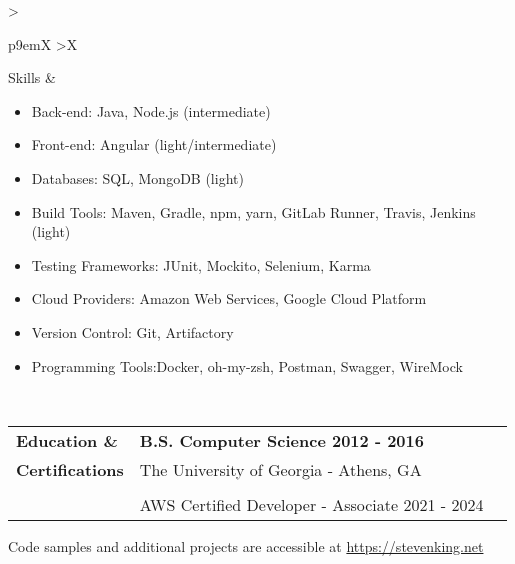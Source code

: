 \documentclass[final]{letter}
\begin{document}
	\begin{tabularx}{\linewidth}{
		>{\raggedright\bf\Large}p{9em}X
		>{\centering}X
	} 
		Skills & \begin{itemize}[topsep=1pt,noitemsep]
			\item[] Back-end: \tab Java, Node.js (intermediate)
			\item[] Front-end: \tab Angular (light/intermediate)
			\item[] Databases: \tab SQL, MongoDB (light)
			\item[] Build Tools: \tab Maven, Gradle, npm, yarn, GitLab Runner, Travis, Jenkins (light)
			\item[] Testing Frameworks: \tab JUnit, Mockito, Selenium, Karma
			\item[] Cloud Providers: \tab Amazon Web Services, Google Cloud Platform
			\item[] Version Control: \tab Git, Artifactory
			\item[] Programming Tools:\tab Docker, oh-my-zsh, Postman, Swagger, WireMock
		\end{itemize}
	\end{tabularx} \\

	\begin{tabularx}{\linewidth} {
		>{\raggedright\bf\Large}p{10em}X
		>{\centering}X
	} 
		Education \& & \large\bf{B.S. Computer Science \hfill 2012 - 2016} \\
		Certifications & The University of Georgia - Athens, GA \\
		& \\
		& AWS Certified Developer - Associate \hfill 2021 - 2024
	\end{tabularx}

	\vspace{1.5em}

	\begin{center}
		Code samples and additional projects are accessible at \href{https://stevenking.net}{https://stevenking.net}
	\end{center}
\end{document}
